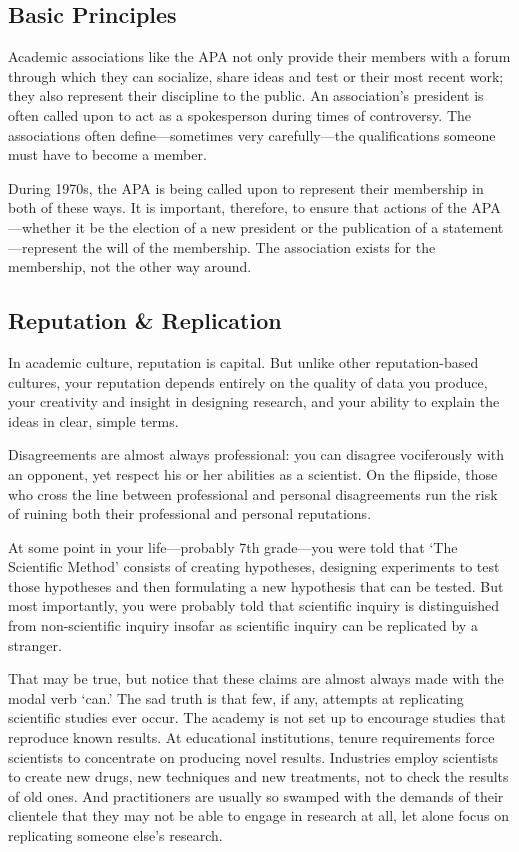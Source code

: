 \begin{refsection}
\section{Basic Principles}
\label{basicprinciples}

Academic associations like the APA not only provide their members with a forum through which they can socialize, share ideas and test or their most recent work; they also represent their discipline to the public. An association's president is often called upon to act as a spokesperson during times of controversy. The associations often define---sometimes very carefully---the qualifications someone must have to become a member.

During 1970s, the APA is being called upon to represent their membership in both of these ways. It is important, therefore, to ensure that actions of the APA---whether it be the election of a new president or the publication of a statement---represent the will of the membership. The association exists for the membership, not the other way around.

\subsection{Reputation \& Replication}
\label{reputationreplication}

In academic culture, reputation is capital. But unlike other reputation-based cultures, your reputation depends entirely on the quality of data you produce, your creativity and insight in designing research, and your ability to explain the ideas in clear, simple terms. 

Disagreements are almost always professional: you can disagree vociferously with an opponent, yet respect his or her abilities as a scientist. On the flipside, those who cross the line between professional and personal disagreements run the risk of ruining both their professional and personal reputations.

At some point in your life---probably 7th grade---you were told that `The Scientific Method' consists of creating hypotheses, designing experiments to test those hypotheses and then formulating a new hypothesis that can be tested. But most importantly, you were probably told that scientific inquiry is distinguished from non-scientific inquiry insofar as scientific inquiry can be replicated by a stranger. 

That may be true, but notice that these claims are almost always made with the modal verb `can.' The sad truth is that few, if any, attempts at replicating scientific studies ever occur. The academy is not set up to encourage studies that reproduce known results. At educational institutions, tenure requirements force scientists to concentrate on producing novel results. Industries employ scientists to create new drugs, new techniques and new treatments, not to check the results of old ones. And practitioners are usually so swamped with the demands of their clientele that they may not be able to engage in research at all, let alone focus on replicating someone else's research.


\end{refsection}
